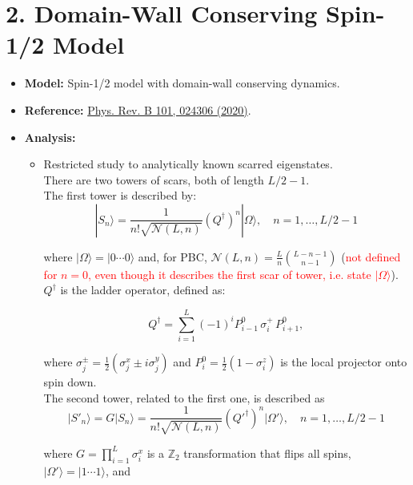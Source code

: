 \documentclass[11pt]{article}
\begin{document}
\section*{2. Domain-Wall Conserving Spin-1/2 Model}
\begin{itemize}
    \item \textbf{Model:} Spin-1/2 model with domain-wall conserving dynamics.
	

    \item \textbf{Reference:} \href{https://journals.aps.org/prb/pdf/10.1103/PhysRevB.101.024306}{Phys. Rev. B 101, 024306 (2020)}.
    \item \textbf{Analysis:}
    \begin{itemize}
        \item Restricted study to analytically known scarred eigenstates.\\ There are two towers of scars, both of length $L/2 - 1$.\\
    The first tower is described by:
	    \begin{equation}
	|S_n\rangle = \frac{1}{n! \sqrt{\mathcal{N}(L, n)}} \left(Q^\dagger\right)^n |\Omega\rangle, \quad n = 1,\hdots,L/2 - 1
	\end{equation}
	
	where $|\Omega\rangle = |0 \cdots 0\rangle$ and, for PBC, $\mathcal{N}(L, n) = \frac{L}{n} \binom{L - n - 1}{n - 1}$ (\textcolor{red}{not defined for $n=0$, even though it describes the first scar of tower, i.e. state $|\Omega\rangle $}). $Q^\dagger$ is the ladder operator, defined as:
	
	\begin{equation}
	Q^\dagger = \sum_{i = 1}^{L} (-1)^i P^0_{i-1} \, \sigma^+_i \, P^0_{i+1}, 
	\end{equation}
	
	where $\sigma_j^\pm = \frac{1}{2} (\sigma_j^x \pm i \sigma_j^y)$ and $P^0_i = \frac{1}{2} (1 - \sigma^z_i)$ is the local projector onto spin down.\\
     The second tower, related to the first one, is described as 
     \begin{equation}
	|S'_n\rangle = G |S_n\rangle = \frac{1}{n! \sqrt{\mathcal{N}(L, n)}} \left(Q'^\dagger\right)^n |\Omega'\rangle, \quad n = 1,\hdots,L/2 - 1
	\end{equation}
	
	\noindent where $G = \prod_{i=1}^L \sigma_i^x$ is a $\mathbb{Z}_2$ transformation that flips all spins, 
	$|\Omega'\rangle = |1 \cdots 1\rangle$, and
	

\end{itemize}
\end{itemize}
\end{document}
